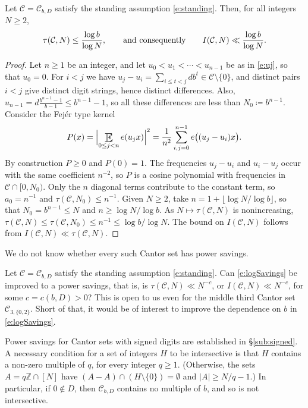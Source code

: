 \begin{proposition}\label{p:logSavings}
Let $\mathcal C=\mathcal C_{b,D}$ satisfy the standing assumption \eqref{e:standing}. Then, for all integers $N\geq 2$, 
\begin{equation}\label{e:logSavings}
\tau(\mathcal C, N) \leq \frac{\log b}{\log N} , \qquad\textup{and consequently}\qquad I(\mathcal C,N) \ll \frac{\log b}{\log N}. 
\end{equation}
\end{proposition}

\begin{proof}
Let $n\geq 1$ be an integer, and let $u_0<u_1<\cdots <u_{n-1}$ be as in \eqref{e:uj}, so that $u_0=0$. 
For $i<j$ we have $u_j-u_i=\sum_{i\leq t<j}db^t\in\mathcal C\setminus\{0\}$, and distinct pairs $i<j$ give distinct digit strings, hence distinct differences. 
Also, $u_{n-1}=d\frac{b^{n-1}-1}{b-1}\leq b^{n-1}-1$, so all these differences are less than $N_0\coloneqq b^{n-1}$. 
Consider the Fej\'er type kernel 
\begin{align}
    P (x) = \Bigl\lvert \Expectation_{0\leq j<n} e(u_jx)\Bigr\rvert^2 
    = \frac {1}{n ^2 } \sum_{i,j=0} ^{n-1} e\bigl( (u_j-u_i)x\bigr) . 
\end{align}
By construction $P\geq 0$ and $P(0)=1$. The frequencies $u_j-u_i$ and $u_i-u_j$ occur with the same coefficient $n^{-2}$, so $P$ is a cosine polynomial with frequencies in $\mathcal C\cap [0,N_0)$. 
Only the $n$ diagonal terms contribute to the constant term, so $a_0=n^{-1}$ and $\tau(\mathcal C,N_0)\leq n ^{-1} $. 
Given $N\geq 2$, take $n=1+\lfloor \log N/\log b\rfloor$, so that $N_0=b^{n-1}\leq N$ and $n\geq \log N/\log b$. 
As $N\mapsto \tau(\mathcal C,N)$ is nonincreasing, $\tau(\mathcal C,N)\leq \tau(\mathcal C,N_0)\leq n^{-1}\leq \log b/\log N$. 
The bound on $I(\mathcal C,N)$ follows from $I(\mathcal C,N)\ll \tau(\mathcal C,N)$. 
\end{proof}

We do not know whether every such Cantor set has power savings. 

\begin{question}\label{q:powersavings}
Let $\mathcal C=\mathcal C_{b,D}$ satisfy the standing assumption \eqref{e:standing}. 
Can \eqref{e:logSavings} be improved to a power savings, that is, is $\tau(\mathcal C,N)\ll N^{-c}$, or $I(\mathcal C,N)\ll N^{-c}$, for some $c=c(b,D)>0$? 
This is open to us even for the middle third Cantor set $\mathcal C_{3,\{0,2\}}$. 
Short of that, it would be of interest to improve the dependence on $b$ in \eqref{e:logSavings}. 
\end{question}
Power savings for Cantor sets with signed digits are established in \S\ref{sub:signed}. 
A necessary condition for a set of integers $H$ to be intersective is that $H$ contains a non-zero multiple of $q$, for every integer $q\geq 1$. 
(Otherwise, the sets $A=q\mathbb{Z}\cap[N]$ have $(A-A)\cap (H\setminus\{0\})=\emptyset$ and $\lvert A\rvert\geq N/q-1$.) 
In particular, if $0\notin D$, then $\mathcal C_{b,D}$ contains no multiple of $b$, and so is not intersective. 
 

